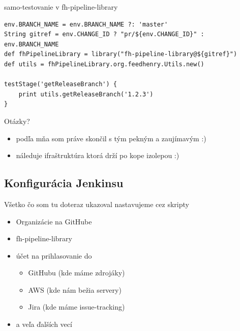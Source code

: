 \documentclass[bigger]{beamer}
\begin{document}
\begin{frame}[fragile,label={sec:org7ca9310}]{samo-testovanie v fh-pipeline-library}
 \begin{verbatim}
env.BRANCH_NAME = env.BRANCH_NAME ?: 'master'
String gitref = env.CHANGE_ID ? "pr/${env.CHANGE_ID}" : env.BRANCH_NAME
def fhPipelineLibrary = library("fh-pipeline-library@${gitref}")
def utils = fhPipelineLibrary.org.feedhenry.Utils.new()

testStage('getReleaseBranch') {
    print utils.getReleaseBranch('1.2.3')
}
\end{verbatim}
\end{frame}

\begin{frame}[label={sec:orge114ea0}]{Otázky?}
\begin{itemize}
\item podľa mňa som práve skončil s tým pekným a zaujímavým :)
\item náleduje ifraštruktúra ktorá drží po kope izolepou :)
\end{itemize}
\end{frame}

\subsection{Konfigurácia Jenkinsu}
\label{sec:org8eabab8}
\begin{frame}[label={sec:org1ee62d2}]{Všetko čo som tu doteraz ukazoval nastavujeme cez skripty}
\begin{itemize}
\item Organizácie na GitHube
\item fh-pipeline-library
\item účet na prihlasovanie do
\begin{itemize}
\item GitHubu (kde máme zdrojáky)
\item AWS (kde nám bežia servery)
\item Jira (kde máme issue-tracking)
\end{itemize}
\item a veľa ďalších vecí
\end{itemize}
\end{frame}
\end{document}
